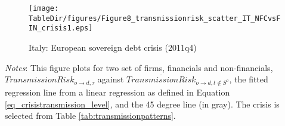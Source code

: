 \documentclass[12pt,oneside,leqno]{article}
\newcommand*{\TableDir}{.}
\begin{document}
\clearpage
\begin{figure}[!h]
\centering
\caption{Italy: European sovereign debt crisis (2011q4)}\label{fig:transmissionrisk_fin}
\texttt{[image: \\TableDir/figures/Figure8\_transmissionrisk\_scatter\_IT\_NFCvsFIN\_crisis1.eps]}

\end{figure}
\vspace{-.1in}
\begin{minipage}[!h]{\textwidth}
\footnotesize\textit{Notes}: This figure plots for two set of firms, financials and non-financials, $\textit{TransmissionRisk}_{o\to d, \tau}$ against $\overline{\textit{TransmissionRisk}}_{o\to d, t\notin S^{o}}$, the fitted regression line from a linear regression as defined in Equation \ref{eq_crisistransmission_level}, and the 45 degree line (in gray). The crisis is selected from Table \ref{tab:transmissionpatterns}.
\end{minipage}
\end{document}
